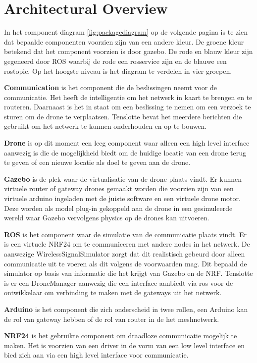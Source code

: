 \documentclass[a4paper, 11pt, oneside]{report}
\begin{document}
\chapter{Architectural Overview}
\label{architectural}
In het component diagram \autoref{fig:packagediagram} op de volgende pagina is te zien dat bepaalde componenten voorzien zijn van een andere kleur. 
De groene kleur betekend dat het component voorzien is door gazebo.
De rode en blauw kleur zijn gegeneerd door ROS waarbij de rode een rosservice zijn en de blauwe een rostopic.
Op het hoogste niveau is het diagram te verdelen in vier groepen.

\textbf{Communication} is het component die de beslissingen neemt voor de communicatie.
Het heeft de intelligentie om het netwerk in kaart te brengen en te routeren.
Daarnaast is het in staat om een beslissing te nemen om een verzoek te sturen om de drone te verplaatsen.
Tenslotte bevat het meerdere berichten die gebruikt om het netwerk te kunnen onderhouden en op te bouwen.    

\textbf{Drone} is op dit moment een leeg component waar alleen een high level interface aanwezig is die de mogelijkheid biedt om de huidige locatie van een drone terug te geven of een nieuwe locatie als doel te geven aan de drone. 

\textbf{Gazebo} is de plek waar de virtualisatie van de drone plaats vindt.
Er kunnen virtuele router of gateway drones gemaakt worden die voorzien zijn van een virtuele arduino ingeladen met de juiste software en een virtuele drone motor.
Deze worden als model plug-in gekoppeld aan de drone in een gesimuleerde wereld waar Gazebo vervolgens physics op de drones kan uitvoeren. 

\textbf{ROS} is het component waar de simulatie van de communicatie plaats vindt.
Er is een virtuele NRF24 om te communiceren met andere nodes in het netwerk.
De aanwezige WirelessSignalSimulator zorgt dat dit realistisch gebeurd door alleen communicatie uit te voeren als dit volgens de voorwaarden mag.
Dit bepaald de simulator op basis van informatie die het krijgt van Gazebo en de NRF.
Tenslotte is er een DroneManager aanwezig die een interface aanbiedt via ros voor de ontwikkelaar om verbinding te maken met de gateways uit het netwerk.

\textbf{Arduino} is het component die zich onderscheid in twee rollen, een Arduino kan de rol van gateway hebben of de rol van router in de het meshnetwerk.

\textbf{NRF24} is het gebruikte component om draadloze communicatie mogelijk te maken. Het is voorzien van een driver in de vorm van een low level interface en bied zich aan via een high level interface voor communicatie.
\end{document}
